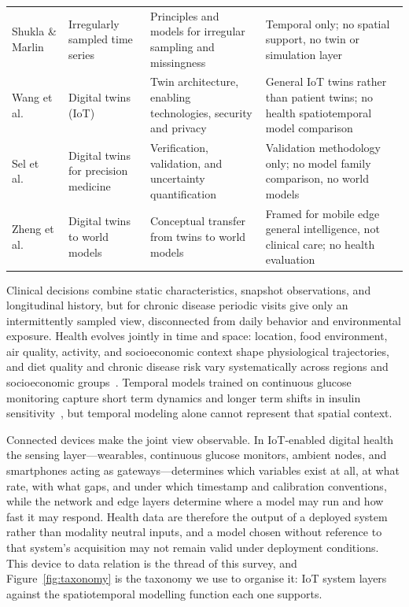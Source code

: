 \documentclass[journal]{IEEEtran}
\newif\ifsubmission
\begin{document}
\begin{table}[t]
\begin{tabularx}{\textwidth}{>{\raggedright\arraybackslash}p{2.5cm} >{\raggedright\arraybackslash}p{2.6cm} >{\raggedright\arraybackslash}X >{\raggedright\arraybackslash}X}
\addlinespace[2pt]
Shukla \& Marlin~\cite{shukla2021irregular} & Irregularly sampled time series & Principles and models for irregular sampling and missingness & Temporal only; no spatial support, no twin or simulation layer \\
\addlinespace[2pt]
Wang et al.~\cite{Wang2023Survey} & Digital twins (IoT) & Twin architecture, enabling technologies, security and privacy & General IoT twins rather than patient twins; no health spatiotemporal model comparison \\
\addlinespace[2pt]
Sel et al.~\cite{Sel2025VVUQ} & Digital twins for precision medicine & Verification, validation, and uncertainty quantification & Validation methodology only; no model family comparison, no world models \\
\addlinespace[2pt]
Zheng et al.~\cite{Zheng2026DTtoWM} & Digital twins to world models & Conceptual transfer from twins to world models & Framed for mobile edge general intelligence, not clinical care; no health evaluation \\
\bottomrule
\end{tabularx}
\fi
\end{table}

\ifsubmission
Clinical decisions combine static characteristics, snapshot observations, and longitudinal history, but for chronic disease periodic visits give only an intermittently sampled view, disconnected from daily behavior and environmental exposure. Health evolves jointly in time and space: location, food environment, air quality, activity, and socioeconomic context shape physiological trajectories, and diet quality and chronic disease risk vary systematically across regions and socioeconomic groups~\cite{McCullough2022Diet}. Temporal models trained on continuous glucose monitoring capture short term dynamics and longer term shifts in insulin sensitivity~\cite{Vaughan2025CGMPrediction}, but temporal modeling alone cannot represent that spatial context.

Connected devices make the joint view observable. In IoT-enabled digital health the sensing layer---wearables, continuous glucose monitors, ambient nodes, and smartphones acting as gateways---determines which variables exist at all, at what rate, with what gaps, and under which timestamp and calibration conventions, while the network and edge layers determine where a model may run and how fast it may respond. Health data are therefore the output of a deployed system rather than modality neutral inputs, and a model chosen without reference to that system's acquisition may not remain valid under deployment conditions. This device to data relation is the thread of this survey, and Figure~\ref{fig:taxonomy} is the taxonomy we use to organise it: IoT system layers against the spatiotemporal modelling function each one supports.
\end{document}
